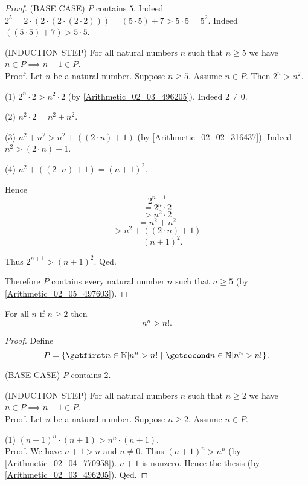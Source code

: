 \documentclass[../../arithmetic.tex]{subfiles}
\begin{document}
\begin{forthel}
\begin{proof}
      (BASE CASE) $P$ contains $5$.
      Indeed $2^{5} = 2 \cdot (2 \cdot (2 \cdot (2 \cdot 2))) = (5 \cdot 5) + 7 > 5 \cdot 5 = 5^{2}$.
      Indeed $((5 \cdot 5) + 7) > 5 \cdot 5$.

      (INDUCTION STEP) For all natural numbers $n$ such that $n \geq 5$ we have $n \in P \implies n + 1 \in P$. \\
      Proof.
        Let $n$ be a natural number.
        Suppose $n \geq 5$.
        Assume $n \in P$.
        Then $2^{n} > n^{2}$.

        (1) $2^{n} \cdot 2 > n^{2} \cdot 2$ (by \ref{Arithmetic_02_03_496205}).
        Indeed $2 \neq 0$.

        (2) $n^{2} \cdot 2 = n^{2} + n^{2}$.

        (3) $n^{2} + n^{2} > n^{2} + ((2 \cdot n) + 1)$ (by \ref{Arithmetic_02_02_316437}).
        Indeed $n^{2} > (2 \cdot n) + 1$.

        (4) $n^{2} + ((2 \cdot n) + 1) = (n + 1)^{2}$.

        Hence
        \[   2^{n + 1} \]
        \[ = 2^{n} \cdot 2 \]
        \[ > n^{2} \cdot 2 \]
        \[ = n^{2} + n^{2} \]
        \[ > n^{2} + ((2 \cdot n) + 1) \]
        \[ = (n + 1)^{2}. \]

        Thus $2^{n + 1} > (n + 1)^{2}$.
      Qed.

      Therefore $P$ contains every natural number $n$ such that $n \geq 5$ (by \ref{Arithmetic_02_05_497603}).
    \end{proof}


    \begin{proposition}\label{Arithmetic_02_06_527159}
      For all $n$ if $n \geq 2$ then \[ n^{n} > n!. \]
    \end{proposition}
    \begin{proof}
      Define \[ P = \class{n \in \Nat | n^{n} > n!}. \]

      (BASE CASE) $P$ contains $2$.

      (INDUCTION STEP) For all natural numbers $n$ such that $n \geq 2$ we have $n \in P \implies n + 1 \in P$. \\
      Proof.
        Let $n$ be a natural number.
        Suppose $n \geq 2$.
        Assume $n \in P$.

        (1) $(n + 1)^{n} \cdot (n + 1) > n^{n} \cdot (n + 1)$. \\
        Proof.
          We have $n + 1 > n$ and $n \neq 0$.
          Thus $(n + 1)^{n} > n^{n}$ (by \ref{Arithmetic_02_04_770958}).
          $n + 1$ is nonzero.
          Hence the thesis (by \ref{Arithmetic_02_03_496205}).
        Qed.


\end{proof}
\end{forthel}
\end{document}
